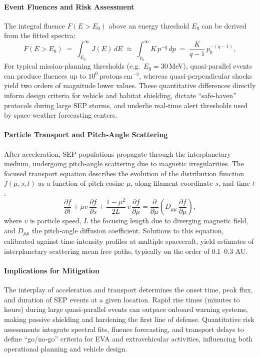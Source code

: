 \documentclass[12pt]{report}
\begin{document}
\paragraph{Event Fluences and Risk Assessment}  
The integral fluence $F(E>E_0)$ above an energy threshold $E_0$ can be derived from the fitted spectra:
\begin{equation}
  F(E>E_0) \;=\; \int_{E_0}^{\infty} J(E)\,dE
  \;\approx\; \int_{p_0}^{\infty} K\,p^{-q}\,dp
  \;=\; \frac{K}{q-1}\,p_0^{-(q-1)},
\end{equation}
For typical mission-planning thresholds (e.g.\ $E_0=30\,$MeV), quasi-parallel events can produce fluences up to $10^6$\,protons\,cm$^{-2}$, whereas quasi-perpendicular shocks yield two orders of magnitude lower values.  These quantitative differences directly inform design criteria for vehicle and habitat shielding, dictate ``safe-haven'' protocols during large SEP storms, and underlie real-time alert thresholds used by space-weather forecasting centers.



\paragraph{Particle Transport and Pitch‐Angle Scattering}  
After acceleration, SEP populations propagate through the interplanetary medium, undergoing pitch‐angle scattering due to magnetic irregularities.  The focused transport equation \cite{ruffolo1995focused} describes the evolution of the distribution function $f(\mu,s,t)$ as a function of pitch‐cosine $\mu$, along‐filament coordinate $s$, and time $t$:
\begin{equation}
  \frac{\partial f}{\partial t}
  + \mu v\,\frac{\partial f}{\partial s}
  + \frac{1-\mu^2}{2L}\,v\,\frac{\partial f}{\partial \mu}
  = \frac{\partial}{\partial \mu}
    \left(D_{\mu\mu}\,\frac{\partial f}{\partial \mu}\right),
\end{equation}
where $v$ is particle speed, $L$ the focusing length due to diverging magnetic field, and $D_{\mu\mu}$ the pitch‐angle diffusion coefficient.  Solutions to this equation, calibrated against time‐intensity profiles at multiple spacecraft, yield estimates of interplanetary scattering mean free paths, typically on the order of 0.1–0.3 AU.

\paragraph{Implications for Mitigation}  
The interplay of acceleration and transport determines the onset time, peak flux, and duration of SEP events at a given location.  Rapid rise times (minutes to hours) during large quasi‐parallel events can outpace onboard warning systems, making passive shielding and hardening the first line of defense.  Quantitative risk assessments integrate spectral fits, fluence forecasting, and transport delays to define “go/no‐go” criteria for EVA and extravehicular activities, influencing both operational planning and vehicle design.
\end{document}
